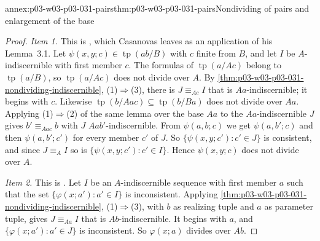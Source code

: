 \begin{annexitem}{annex:p03-w03-p03-031-pairs}{thm:p03-w03-p03-031-pairs}{Nondividing of pairs and enlargement of the base}
\begin{proof}
\emph{Item 1.}  This is \cite[Proposition~3.4, p.~267]{Casanovas2007Simplicity},
which Casanovas leaves as an application of his Lemma~3.1.  Let
\(\psi(x,y;c)\in\operatorname{tp}(ab/B)\) with \(c\) finite from \(B\), and
let \(I\) be \(A\)-indiscernible with first member \(c\).  The formulas of
\(\operatorname{tp}(a/Ac)\) belong to \(\operatorname{tp}(a/B)\), so
\(\operatorname{tp}(a/Ac)\) does not divide over \(A\).  By
\cref{thm:p03-w03-p03-031-nondividing-indiscernible}, (1)\(\Rightarrow\)(3),
there is \(J\equiv_{Ac}I\) that is \(Aa\)-indiscernible; it begins with
\(c\).  Likewise \(\operatorname{tp}(b/Aac)\subseteq
\operatorname{tp}(b/Ba)\) does not divide over \(Aa\).  Applying
(1)\(\Rightarrow\)(2) of the same lemma over the base \(Aa\) to the
\(Aa\)-indiscernible \(J\) gives \(b'\equiv_{Aac}b\) with \(J\)
\(Aab'\)-indiscernible.  From \(\psi(a,b;c)\) we get \(\psi(a,b';c)\) and
then \(\psi(a,b';c')\) for every member \(c'\) of \(J\).  So
\(\{\psi(x,y;c'):c'\in J\}\) is consistent, and since \(J\equiv_AI\) so is
\(\{\psi(x,y;c'):c'\in I\}\).  Hence \(\psi(x,y;c)\) does not divide over
\(A\).

\emph{Item 2.}  This is \cite[Proposition~3.5, p.~267]{Casanovas2007Simplicity}.
Let \(I\) be an \(A\)-indiscernible sequence with first member \(a\)
such that the set \(\{\varphi(x;a'):a'\in I\}\) is inconsistent.  Applying
\cref{thm:p03-w03-p03-031-nondividing-indiscernible}, (1)\(\Rightarrow\)(3),
with \(b\) as realizing tuple and \(a\) as parameter tuple, gives
\(J\equiv_{Aa}I\) that is \(Ab\)-indiscernible.  It begins with \(a\), and
\(\{\varphi(x;a'):a'\in J\}\) is inconsistent.  So \(\varphi(x;a)\) divides
over \(Ab\).
\end{proof}
\end{annexitem}

